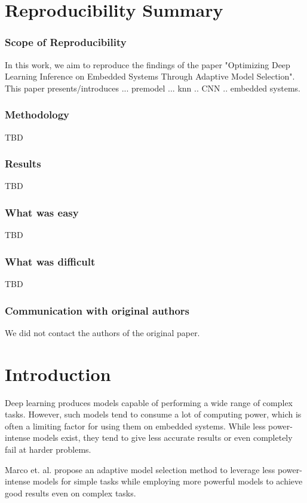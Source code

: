 \section*{Reproducibility Summary}


\subsubsection{Scope of Reproducibility}
In this work, we aim to reproduce the findings of the paper "Optimizing Deep Learning Inference on Embedded Systems Through Adaptive Model Selection"\supercite{marco2019optimizing}. This paper presents/introduces ... premodel ... knn .. CNN .. embedded systems.

\subsubsection{Methodology}
TBD

\subsubsection{Results}
TBD

\subsubsection{What was easy}
TBD

\subsubsection{What was difficult}
TBD

\subsubsection{Communication with original authors}
We did not contact the authors of the original paper.



\section{Introduction}
Deep learning produces models capable of performing a wide range of complex tasks. However, such models tend to consume a lot of computing power, which is often a limiting factor for using them on embedded systems. While less power-intense models exist, they tend to give less accurate results or even completely fail at harder problems.

Marco et. al. \cite{marco2019optimizing} propose an adaptive model selection method to leverage less power-intense models for simple tasks while employing more powerful models to achieve good results even on complex tasks.

